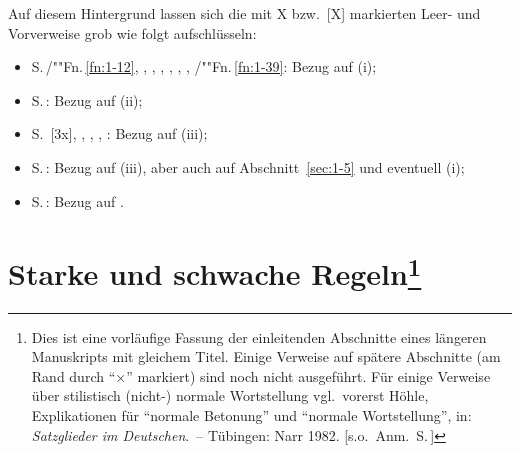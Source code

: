 \documentclass[output=paper]{langsci/langscibook}
\begin{document}
Auf diesem Hintergrund lassen sich die mit X bzw.\ [X] markierten Leer- und Vorverweise grob wie folgt aufschlüsseln:
\begin{itemize}
		\item  S.\,\pageref{fn:1-12}/""Fn.\,\ref{fn:1-12}, \pageref{X:1}, \pageref{X:2},
                  \pageref{X:10}, \pageref{X:3}, \pageref{X:4}, \pageref{ex:1-8.1-20b},
                  \pageref{fn:1-39}/""Fn.\,\ref{fn:1-39}: Bezug auf (i);
		\item S.\,\pageref{ex:1-8.2-3b}: Bezug auf (ii);
		\item S.\,\pageref{ex:1-1-5} [3x], \pageref{fn:1-15}, \pageref{X:5}, \pageref{X:6}, \pageref{X:7}: Bezug auf (iii);
		\item S.\,\pageref{X:8}: Bezug auf (iii), aber auch auf Abschnitt~\ref{sec:1-5} und eventuell (i);
		\item S.\,\pageref{X:9}: Bezug auf \citet{Hoehle78a}.
\end{itemize}
\printbibliography[heading=subbibliography]%

\newrefsection


\maketitle
\label{chap-topo-hoehles-content}
\label{chap:1}\label{chap-topo}

\renewcommand*{\thefootnote}{\fnsymbol{footnote}}
\setcounter{footnote}{0}


\section[Starke und schwache Regeln]{Starke und schwache Regeln\protect\footnote{\label{fn-autor-topo}Dies ist eine vorläufige Fassung der einleitenden Abschnitte eines
		längeren Manuskripts mit gleichem Titel. Einige Verweise auf spätere
		Abschnitte (am Rand durch "`×"' markiert) sind noch nicht
		ausgeführt. Für einige Verweise über stilistisch (nicht-) normale
		Wortstellung vgl.\ vorerst Höhle, Explikationen für "`normale Betonung"'
		und "`normale Wortstellung"', in: \textit{Satzglieder im Deutschen}.~– Tübingen:
		Narr 1982. [s.o.\ Anm.\ S.\,\pageref{fn-herausgeber-topo}]} }\label{sec:1-1}


\renewcommand*{\thefootnote}{\arabic{footnote}}
\setcounter{footnote}{0}

\ssubsection{}%
\label{subsec:1-1.1}
\end{document}
